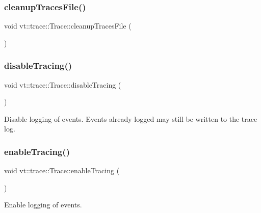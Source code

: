 \subsubsection{\texorpdfstring{cleanup\+Traces\+File()}{cleanupTracesFile()}}
{\footnotesize\ttfamily void vt\+::trace\+::\+Trace\+::cleanup\+Traces\+File (\begin{DoxyParamCaption}{ }\end{DoxyParamCaption})}

\mbox{\label{structvt_1_1trace_1_1_trace_a54f34dbcf8960de7b319e44ef9b76eb0}} 
\subsubsection{\texorpdfstring{disable\+Tracing()}{disableTracing()}}
{\footnotesize\ttfamily void vt\+::trace\+::\+Trace\+::disable\+Tracing (\begin{DoxyParamCaption}{ }\end{DoxyParamCaption})}

Disable logging of events. Events already logged may still be written to the trace log. \mbox{\label{structvt_1_1trace_1_1_trace_ae7ef14764ce87e0ea8baf802db400066}} 
\subsubsection{\texorpdfstring{enable\+Tracing()}{enableTracing()}}
{\footnotesize\ttfamily void vt\+::trace\+::\+Trace\+::enable\+Tracing (\begin{DoxyParamCaption}{ }\end{DoxyParamCaption})}



Enable logging of events. 

\mbox{\label{structvt_1_1trace_1_1_trace_a0262f4025460c9d61cac60420e75ef77}} 
